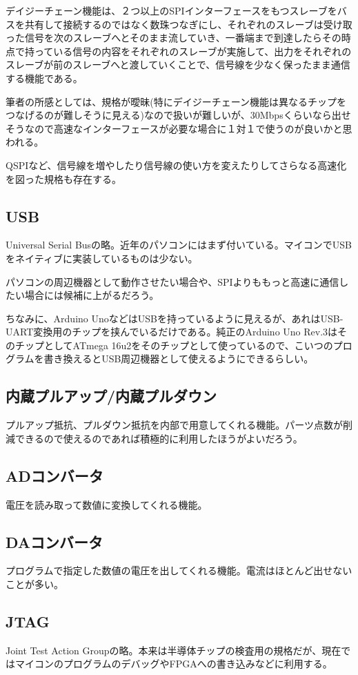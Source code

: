 \documentclass[a4paper,titlepage,here]{ujarticle}
\begin{document}
デイジーチェーン機能は、２つ以上のSPIインターフェースをもつスレーブをバスを共有して接続するのではなく数珠つなぎにし、それぞれのスレーブは受け取った信号を次のスレーブへとそのまま流していき、一番端まで到達したらその時点で持っている信号の内容をそれぞれのスレーブが実施して、出力をそれぞれのスレーブが前のスレーブへと渡していくことで、信号線を少なく保ったまま通信する機能である。

筆者の所感としては、規格が曖昧(特にデイジーチェーン機能は異なるチップをつなげるのが難しそうに見える)なので扱いが難しいが、30Mbpsくらいなら出せそうなので高速なインターフェースが必要な場合に１対１で使うのが良いかと思われる。

QSPIなど、信号線を増やしたり信号線の使い方を変えたりしてさらなる高速化を図った規格も存在する。
\subsection{USB}
Universal Serial Busの略。近年のパソコンにはまず付いている。マイコンでUSBをネイティブに実装しているものは少ない。

パソコンの周辺機器として動作させたい場合や、SPIよりももっと高速に通信したい場合には候補に上がるだろう。

ちなみに、Arduino UnoなどはUSBを持っているように見えるが、あれはUSB-UART変換用のチップを挟んでいるだけである。純正のArduino Uno Rev.3はそのチップとしてATmega 16u2をそのチップとして使っているので、こいつのプログラムを書き換えるとUSB周辺機器として使えるようにできるらしい。
\subsection{内蔵プルアップ/内蔵プルダウン}
プルアップ抵抗、プルダウン抵抗を内部で用意してくれる機能。パーツ点数が削減できるので使えるのであれば積極的に利用したほうがよいだろう。
\subsection{ADコンバータ}
電圧を読み取って数値に変換してくれる機能。
\subsection{DAコンバータ}
プログラムで指定した数値の電圧を出してくれる機能。電流はほとんど出せないことが多い。
\subsection{JTAG}
Joint Test Action Groupの略。本来は半導体チップの検査用の規格だが、現在ではマイコンのプログラムのデバッグやFPGAへの書き込みなどに利用する。
\end{document}

